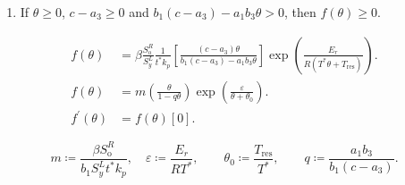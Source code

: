 \documentclass[
    8pt,
    aspectratio=1610,
    c,
    intlimits,
    leqno,
    professionalfonts,
]{beamer}
\begin{document}
\begin{frame}
\begin{enumerate}
		      \

		\item

		      If $\theta\geq 0$, $c-a_{3}\geq 0$ and
		      $b_{1}\left(c-a_{3}\right)-a_{1}b_{3}\theta>0$,
		      then $f\left(\theta\right)\geq 0$.
	\end{enumerate}
\end{frame}

\begin{frame}
	\begin{align*}
		f\left(\theta\right)          & =
		\beta
		\frac{S^{R}_{\text{o}}}{S^{L}_{y}}
		\frac{1}{t^{\ast}k_{p}}
		\left[
			\frac{
				\left(c-a_{3}\right)\theta}{
				b_{1}
				\left(c-a_{3}\right)-
				a_{1}
				b_{3}
				\theta
			}
			\right]
		\exp
		\left(
		\frac{E_{r}}{
			R\left(T^{\ast}\theta+T_{\text{res}}\right)
		}
		\right).                                                \\
		f\left(\theta\right)          & =
		m\left(\frac{\theta}{1-q\theta}\right)
		\exp\left(\frac{\varepsilon}{\theta+\theta_{0}}\right). \\
		f^{\prime}\left(\theta\right) & =
		f\left(\theta\right)
		\left[
			0
			\right].
	\end{align*}

	\begin{equation*}
		m\coloneqq
		\frac{\beta S^{R}_{\text{o}}}{b_{1}S^{L}_{y}t^{\ast}k_{p}},\quad
		\varepsilon\coloneqq \frac{E_{r}}{RT^{\ast}},\qquad
		\theta_{0}\coloneqq \frac{T_{\text{res}}}{T^{\ast}},\qquad
		q\coloneqq \frac{a_{1}b_{3}}{b_{1}\left(c-a_{3}\right)}.
	\end{equation*}
\end{frame}
\end{document}
